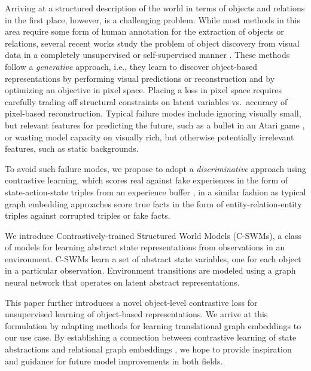 \documentclass{article} %
\begin{document}
Arriving at a structured description of the world in terms of objects and relations in the first place, however, is a challenging problem. While most methods in this area require some form of human annotation for the extraction of objects or relations, several recent works study the problem of object discovery from visual data in a completely unsupervised or self-supervised manner \citep{eslami2016attend,greff2017neural,nash2017multi,van2018relational,kosiorek2018sequential,janner2018reasoning,xu2019unsupervised,burgess2019monet,greff2019multi,engelcke2019genesis}. These methods follow a \textit{generative} approach, i.e., they learn to discover object-based representations by performing visual predictions or reconstruction and by optimizing an objective in pixel space. Placing a loss in pixel space requires carefully trading off structural constraints on latent variables vs.~accuracy of pixel-based reconstruction. Typical failure modes include ignoring visually small, but relevant features for predicting the future, such as a bullet in an Atari game \citep{kaiser2019model}, or wasting model capacity on visually rich, but otherwise potentially irrelevant features, such as static backgrounds.

To avoid such failure modes, we propose to adopt a \textit{discriminative} approach using contrastive learning, which scores real against fake experiences in the form of state-action-state triples from an experience buffer \citep{lin1992self}, in a similar fashion as typical graph embedding approaches score true facts in the form of entity-relation-entity triples against corrupted triples or fake facts.

We introduce Contrastively-trained Structured World Models (C-SWMs), a class of models for learning abstract state representations from observations in an environment. C-SWMs learn a set of abstract state variables, one for each object in a particular observation. Environment transitions are modeled using a graph neural network \citep{scarselli2009graph,li2015gated,kipf2016semi,gilmer2017neural,battaglia2018relational} that operates on latent abstract representations.

This paper further introduces a novel object-level contrastive loss for unsupervised learning of object-based representations. We arrive at this formulation by adapting methods for learning translational graph embeddings \citep{bordes2013translating,wang2014knowledge} to our use case. By establishing a connection between contrastive learning of state abstractions \citep{franccois2018combined,thomas2018disentangling} and relational graph embeddings \citep{nickel2016review}, we hope to provide inspiration and guidance for future model improvements in both fields.
\end{document}
